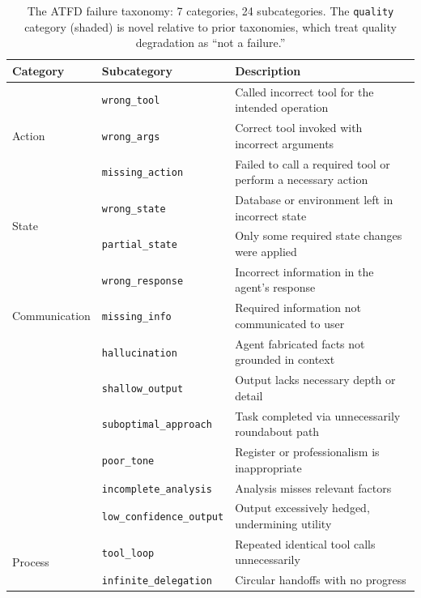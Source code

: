 \documentclass[11pt]{article}
\newcommand{\atfd}{\textsc{ATFD}\xspace}
\begin{document}
\begin{table}[t]
\centering
\caption{The \atfd failure taxonomy: 7 categories, 24 subcategories. The
\texttt{quality} category (shaded) is novel relative to prior taxonomies,
which treat quality degradation as ``not a failure.''}
\label{tab:taxonomy}
\small
\begin{tabular}{@{}llp{6.2cm}@{}}
\toprule
\textbf{Category} & \textbf{Subcategory} & \textbf{Description} \\
\midrule
\multirow{3}{*}{Action}
  & \texttt{wrong\_tool}     & Called incorrect tool for the intended operation \\
  & \texttt{wrong\_args}     & Correct tool invoked with incorrect arguments \\
  & \texttt{missing\_action} & Failed to call a required tool or perform a necessary action \\
\midrule
\multirow{2}{*}{State}
  & \texttt{wrong\_state}    & Database or environment left in incorrect state \\
  & \texttt{partial\_state}  & Only some required state changes were applied \\
\midrule
\multirow{3}{*}{Communication}
  & \texttt{wrong\_response} & Incorrect information in the agent's response \\
  & \texttt{missing\_info}   & Required information not communicated to user \\
  & \texttt{hallucination}   & Agent fabricated facts not grounded in context \\
\midrule
\rowcolor{gray!10}
\multirow{5}{*}{\textcolor{black}{Quality}}
  & \texttt{shallow\_output}       & Output lacks necessary depth or detail \\
\rowcolor{gray!10}
  & \texttt{suboptimal\_approach}  & Task completed via unnecessarily roundabout path \\
\rowcolor{gray!10}
  & \texttt{poor\_tone}            & Register or professionalism is inappropriate \\
\rowcolor{gray!10}
  & \texttt{incomplete\_analysis}  & Analysis misses relevant factors \\
\rowcolor{gray!10}
  & \texttt{low\_confidence\_output} & Output excessively hedged, undermining utility \\
\midrule
\multirow{4}{*}{Process}
  & \texttt{tool\_loop}              & Repeated identical tool calls unnecessarily \\
  & \texttt{infinite\_delegation}    & Circular handoffs with no progress \\

\end{tabular}
\end{table}
\end{document}
